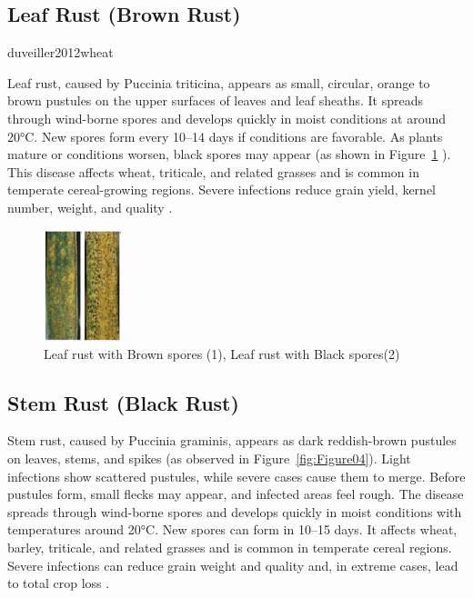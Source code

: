\subsection{Leaf Rust (Brown Rust)}  duveiller2012wheat

Leaf rust, caused by Puccinia triticina, appears as small, circular, orange to brown pustules on the upper surfaces of leaves and leaf sheaths. It spreads through wind-borne spores and develops quickly in moist conditions at around 20°C. New spores form every 10–14 days if conditions are favorable. As plants mature or conditions worsen, black spores may appear (as shown in Figure~\ref{fig:Figure03} ). This disease affects wheat, triticale, and related grasses and is common in temperate cereal-growing regions. Severe infections reduce grain yield, kernel number, weight, and quality \parencite{duveiller2012wheat}.  

\begin{figure}[H]
    \centering
    \includegraphics[width=0.2\textwidth]{chapters/chapter2/images/Figure03.png}
    \caption{Leaf rust with Brown spores (1), Leaf rust with Black spores(2) \protect\parencite{duveiller2012wheat}}
    \label{fig:Figure03}
\end{figure}

\subsection{Stem Rust (Black Rust)}
Stem rust, caused by Puccinia graminis, appears as dark reddish-brown pustules on leaves, stems, and spikes (as observed in Figure~\ref{fig:Figure04}). Light infections show scattered pustules, while severe cases cause them to merge. Before pustules form, small flecks may appear, and infected areas feel rough. The disease spreads through wind-borne spores and develops quickly in moist conditions with temperatures around 20°C. New spores can form in 10–15 days. It affects wheat, barley, triticale, and related grasses and is common in temperate cereal regions. Severe infections can reduce grain weight and quality and, in extreme cases, lead to total crop loss \parencite{duveiller2012wheat}.


